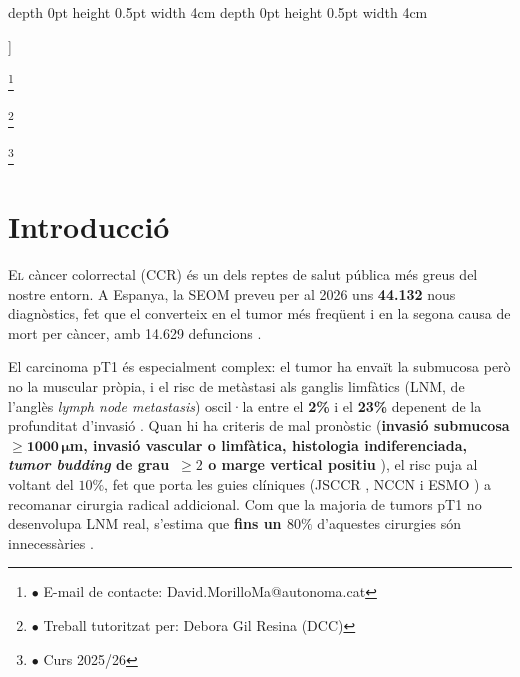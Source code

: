 \documentclass[10pt,a4paper,twocolumn,twoside]{article}
\newcommand\blfootnote[1]{%
  \begingroup
  \renewcommand\thefootnote{}\footnote{#1}%
  \addtocounter{footnote}{-1}%
  \endgroup
}
\begin{document}
\begin{@twocolumnfalse}
\begin{center}
\bigskip

{\vrule depth 0pt height 0.5pt width 4cm\hspace{7.5pt}%
%
\hspace{7.5pt}\vrule depth 0pt height 0.5pt width 4cm\relax}

\end{center}

\bigskip
\end{@twocolumnfalse}]

\blfootnote{$\bullet$ E-mail de contacte: David.MorilloMa@autonoma.cat}
\blfootnote{$\bullet$ Treball tutoritzat per: Debora Gil Resina (DCC)} \blfootnote{$\bullet$ Curs 2025/26}

\section{Introducció}

\lettrine[lines=3]{E}{l} càncer colorrectal (CCR) és un dels reptes de salut pública més greus del nostre
entorn. A Espanya, la SEOM preveu per al 2026 uns \textbf{44.132} nous diagnòstics, fet que el converteix en el tumor
més freqüent i en la segona causa de mort per càncer, amb 14.629 defuncions \cite{seom2026}.

El carcinoma pT1 és especialment complex: el tumor ha envaït la submucosa però no la muscular pròpia, i el risc de
metàstasi als ganglis limfàtics (LNM, de l'anglès \textit{lymph node metastasis}) oscil·la entre el
\textbf{2\%} i el \textbf{23\%} depenent de la profunditat
d'invasió \cite{ParcSalutMar2013}. %
Quan hi ha criteris de mal pronòstic (\textbf{invasió submucosa $\boldsymbol{\geq\!1000\,\mu}$m,
invasió vascular o limfàtica, histologia indiferenciada, \textit{tumor budding} de
grau~$\geq\!2$ o marge vertical positiu} \cite{jsccr2019,dawson2024budding}), el risc puja
al voltant del $10\%$, fet que porta les guies clíniques (JSCCR \cite{jsccr2019}, NCCN i
ESMO \cite{esge2022}) a recomanar cirurgia radical addicional. Com que la majoria de tumors
pT1 no desenvolupa LNM real, s'estima que \textbf{fins un $80\%$} d'aquestes cirurgies són
innecessàries \cite{zaffalon2023,MartinezDeJuan2024}.
\end{document}
